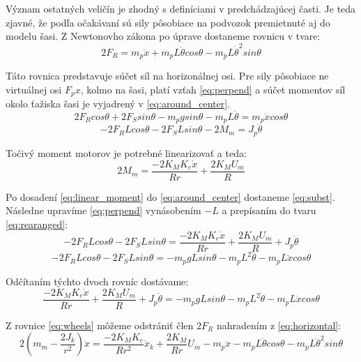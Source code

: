 Význam ostatných veličín je zhodný s definíciami v predchádzajúcej časti. Je teda zjavné, že podľa očakávaní sú sily pôsobiace na podvozok premietnuté aj do modelu šasi. Z Newtonovho zákona po úprave dostaneme rovnicu v tvare:
\begin{equation}
2F_R = m_p \ddot{x} + m_p L \ddot{\theta} cos{\theta} - m_p L\dot{\theta}^2 sin\theta
\label{eq:horizontal}
\end{equation}

Táto rovnica predstavuje súčet síl na horizonálnej osi. Pre sily pôsobiace ne virtuálnej osi $F_px$, kolmo na šasi, platí vzťah \eqref{eq:perpend} a súčet momentov síl okolo ťažiska šasi je vyjadrený v \eqref{eq:around_center}.
\begin{equation}
2F_R cos\theta + 2F_S sin\theta - m_p g sin\theta - m_p L \ddot{\theta} = m_p \ddot{x}cos\theta
\label{eq:perpend}
\end{equation}
\begin{equation}
-2F_R L cos\theta - 2F_S L sin\theta - 2M_m = J_p \ddot{\theta}
\label{eq:around_center}
\end{equation}

Točivý moment motorov je potrebné linearizovať a teda:
\begin{equation}
2M_m = \dfrac{-2K_M K_e \dot{x}}{Rr} + \dfrac{2K_M U_m}{R}
\label{eq:linear_moment}
\end{equation}

Po dosadení \eqref{eq:linear_moment} do \eqref{eq:around_center} dostaneme \eqref{eq:subst}. Následne upravíme \eqref{eq:perpend} vynásobením $-L$ a prepísaním do tvaru \eqref{eq:rearanged}:
\begin{equation}
-2F_R L cos\theta - 2F_S L sin\theta = \dfrac{-2K_M K_e \dot{x}}{Rr} + \dfrac{2K_M U_m}{R} + J_p\ddot{\theta}
\label{eq:subst}
\end{equation}
\begin{equation}
-2F_R L cos\theta - 2F_S L sin\theta = -m_p g L sin\theta - m_p L^2 \ddot{\theta} - m_p L \ddot{x} cos\theta
\label{eq:rearanged}
\end{equation}

Odčítaním týchto dvoch rovníc dostávame:
\begin{equation}
\dfrac{-2K_M K_e \dot{x}}{Rr} + \dfrac{2K_M U_m}{R} + J_p\ddot{\theta} = -m_p g L sin\theta - m_p L^2\ddot{\theta} - m_p L \ddot{x} cos\theta
\label{eq:chasis}
\end{equation}

Z rovnice \eqref{eq:wheels} môžeme odstrániť člen $2F_R$ nahradením z \eqref{eq:horizontal}:
\begin{equation}
2(m_m - \dfrac{2J_k}{r^2}) \ddot{x} = \dfrac{-2K_M K_e}{R r^2}\dot{x}_k + \dfrac{2K_M}{Rr}U_m - m_p \ddot{x} - m_p L \ddot{\theta} cos\theta - m_p L \ddot{\theta}^2 sin\theta
\label{eq:wheels}
\end{equation}

